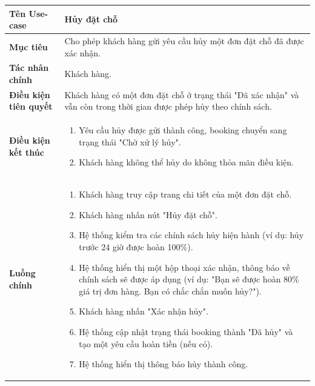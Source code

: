 
\begin{table}[H]
\centering
\renewcommand{\arraystretch}{1.3}
\begin{tabular}{|p{4cm}|p{10cm}|}
\hline
\textbf{Tên Use-case} 
& Hủy đặt chỗ \\ 
\hline

\textbf{Mục tiêu} 
& Cho phép khách hàng gửi yêu cầu hủy một đơn đặt chỗ đã được xác nhận. \\ 
\hline

\textbf{Tác nhân chính} 
& Khách hàng. \\ 
\hline

\textbf{Điều kiện tiên quyết} 
& Khách hàng có một đơn đặt chỗ ở trạng thái "Đã xác nhận" và vẫn còn trong thời gian được phép hủy theo chính sách. \\ 
\hline

\textbf{Điều kiện kết thúc} 
&
\begin{enumerate}
\item Yêu cầu hủy được gửi thành công, booking chuyển sang trạng thái "Chờ xử lý hủy".
\item Khách hàng không thể hủy do không thỏa mãn điều kiện.
\end{enumerate}
\\ 
\hline

\textbf{Luồng chính} 
& 
\begin{enumerate}
    \item Khách hàng truy cập trang chi tiết của một đơn đặt chỗ.
    \item Khách hàng nhấn nút "Hủy đặt chỗ".
    \item Hệ thống kiểm tra các chính sách hủy hiện hành (ví dụ: hủy trước 24 giờ được hoàn 100\%).
    \item Hệ thống hiển thị một hộp thoại xác nhận, thông báo về chính sách sẽ được áp dụng (ví dụ: "Bạn sẽ được hoàn 80\% giá trị đơn hàng. Bạn có chắc chắn muốn hủy?").
    \item Khách hàng nhấn "Xác nhận hủy".
    \item Hệ thống cập nhật trạng thái booking thành "Đã hủy" và tạo một yêu cầu hoàn tiền (nếu có).
    \item Hệ thống hiển thị thông báo hủy thành công.
\end{enumerate} \\ 
\hline


\end{tabular}
\end{table}
